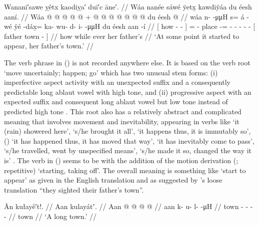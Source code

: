 \ex\label{ex:92-167-town-start-to-appear}%
%
\begingl
	\glpreamble	Wananī′sawe ỵêtx kaodiỵa′ duī′c āne′. //
	\glpreamble	Wáa nanée sáwé ÿetx̱ kawdiÿáa du éesh aaní. //
	\gla	{} Wáa  @ {} @ {} @ {} {}
		 @ {} @ {} +
		 @ {} @  @ {} @ {} @ {} @ {} @ {} 
		{} du éesh  @ {} {} //
	\glb	{} wáa n-  -μμH {} {}
		s= á -wé
		ÿé -dáx̱= ka- wu- d- i-  -μμH
		{} du éesh aan -í {} //
	\glc	{}[ how -  - \· {}]
		=  -
		place -= - - - -
			 -
		{}[  father town - {}] //
	\gld	{} how  {} {} \·while {}
		ever\·  {}
		 {}  {} {} {} {} {}
		{} her father’s  {} {} //
	\glft	‘At some point it started to appear, her father’s town.’
		//
\endgl
\xe
		
The verb phrase  in (\lastx) is not recorded anywhere else.
It is based on the verb root  ‘move uncertainly; happen; go’ which has two unusual stem forms: (i) imperfective aspect activity  with an unexpected  suffix and a consequently predictable long ablaut vowel with high tone, and (ii) progressive aspect  with an expected  suffix and consequent long ablaut vowel but low tone instead of predicted high tone \parencite[12]{leer:1978b}.
This root also has a relatively abstract and complicated meaning that involves movement and inevitability, appearing in verbs like  ‘it (rain) showered here’,  ‘s/he brought it all’,  ‘it happens thus, it is immutably so’,  () ‘it has happened thus, it has moved that way’,  ‘it has inevitably come to pass’,  ‘s/he travelled, went by unspecified means’,  ‘s/he made it so, changed the way it is’ \parencites[03/95–100]{leer:1973}[184–187]{leer:1976}.
The verb in (\lastx) seems to be  with the addition of the motion derivation  (;  repetitive) ‘starting, taking off’.
The overall meaning is something like ‘start to appear’ as given in the English translation and as suggested by \citeauthor{swanton:1909}’s loose translation “they sighted their father’s town”.

\ex\label{ex:92-168-town-start-to-appear}%
%
\begingl
	\glpreamble	Ān kułayê′t!. //
	\glpreamble	Aan kulayátʼ. //
	\gla	Aan  @ {} @ {} @ {} @ {} //
	\glb	aan k- u- l-  -μH //
	\glc	town - - -  - //
	\gld	town  {} {} {} {} //
	\glft	‘A long town.’
		//
\endgl
\xe

